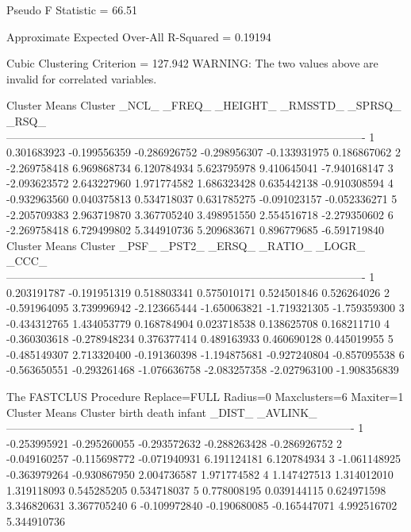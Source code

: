 \documentclass{article}
\begin{document}
\begin{Woutput}
Pseudo F Statistic =    66.51

Approximate Expected Over-All R-Squared =   0.19194

Cubic Clustering Criterion =  127.942
WARNING: The two values above are invalid for correlated variables.

                                          Cluster Means
Cluster          _NCL_         _FREQ_       _HEIGHT_       _RMSSTD_        _SPRSQ_          _RSQ_
-------------------------------------------------------------------------------------------------
   1       0.301683923   -0.199556359   -0.286926752   -0.298956307   -0.133931975    0.186867062
   2      -2.269758418    6.969868734    6.120784934    5.623795978    9.410645041   -7.940168147
   3      -2.093623572    2.643227960    1.971774582    1.686323428    0.635442138   -0.910308594
   4      -0.932963560    0.040375813    0.534718037    0.631785275   -0.091023157   -0.052336271
   5      -2.205709383    2.963719870    3.367705240    3.498951550    2.554516718   -2.279350602
   6      -2.269758418    6.729499802    5.344910736    5.209683671    0.896779685   -6.591719840
                                          Cluster Means
Cluster          _PSF_         _PST2_         _ERSQ_        _RATIO_         _LOGR_          _CCC_
-------------------------------------------------------------------------------------------------
   1       0.203191787   -0.191951319    0.518803341    0.575010171    0.524501846    0.526264026
   2      -0.591964095    3.739996942   -2.123665444   -1.650063821   -1.719321305   -1.759359300
   3      -0.434312765    1.434053779    0.168784904    0.023718538    0.138625708    0.168211710
   4      -0.360303618   -0.278948234    0.376377414    0.489163933    0.460690128    0.445019955
   5      -0.485149307    2.713320400   -0.191360398   -1.194875681   -0.927240804   -0.857095538
   6      -0.563650551   -0.293261468   -1.076636758   -2.083257358   -2.027963100   -1.908356839

The FASTCLUS Procedure
Replace=FULL  Radius=0  Maxclusters=6 Maxiter=1
                                        Cluster Means
Cluster          birth             death            infant            _DIST_          _AVLINK_
----------------------------------------------------------------------------------------------
   1      -0.253995921      -0.295260055      -0.293572632      -0.288263428      -0.286926752
   2      -0.049160257      -0.115698772      -0.071940931       6.191124181       6.120784934
   3      -1.061148925      -0.363979264      -0.930867950       2.004736587       1.971774582
   4       1.147427513       1.314012010       1.319118093       0.545285205       0.534718037
   5       0.778008195       0.039144115       0.624971598       3.346820631       3.367705240
   6      -0.109972840      -0.190680085      -0.165447071       4.992516702       5.344910736


\end{Woutput}
\end{document}
